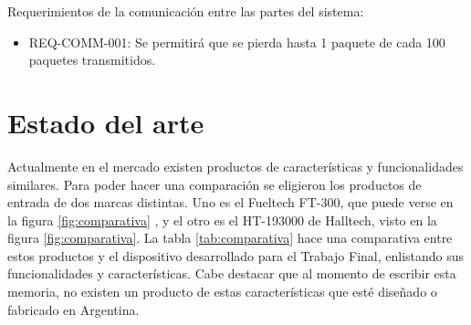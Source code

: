 Requerimientos de la comunicación entre las partes del sistema:
\begin{itemize}
\item REQ-COMM-001: Se permitirá que se pierda hasta 1 paquete de cada 100 paquetes transmitidos.
\end{itemize}


\section{Estado del arte}

Actualmente en el mercado existen productos de características y funcionalidades similares. Para poder hacer una comparación se eligieron los productos de entrada de dos marcas distintas. Uno es el Fueltech FT-300, que puede verse en la figura \ref{fig:comparativa} ,  y el otro es el HT-193000 de Halltech, visto en la figura \ref{fig:comparativa}. La tabla \ref{tab:comparativa} hace una comparativa entre estos productos y el dispositivo desarrollado para el Trabajo Final, enlistando sus funcionalidades y características. Cabe destacar que al momento de escribir esta memoria, no existen un producto de estas características que esté diseñado o fabricado en Argentina.

